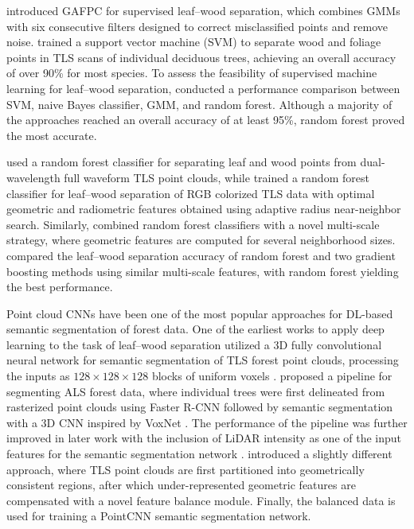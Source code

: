 \cite{ma2016improved} introduced GAFPC for supervised leaf--wood separation, which combines GMMs with six consecutive filters designed to correct misclassified points and remove noise. \cite{yun2016novel} trained a support vector machine (SVM) to separate wood and foliage points in TLS scans of individual deciduous trees, achieving an overall accuracy of over 90\% for most species. To assess the feasibility of supervised machine learning for leaf--wood separation, \cite{wang2017feasibility} conducted a performance comparison between SVM, naive Bayes classifier, GMM, and random forest. Although a majority of the approaches reached an overall accuracy of at least 95\%, random forest proved the most accurate.

\cite{li2018utilization} used a random forest classifier for separating leaf and wood points from dual-wavelength full waveform TLS point clouds, while \cite{zhu2018foliar} trained a random forest classifier for leaf--wood separation of RGB colorized TLS data with optimal geometric and radiometric features obtained using adaptive radius near-neighbor search. Similarly, \cite{zhou2019separating} combined random forest classifiers with a novel multi-scale strategy, where geometric features are computed for several neighborhood sizes. \cite{moorthy2020improved} compared the leaf--wood separation accuracy of random forest and two gradient boosting methods using similar multi-scale features, with random forest yielding the best performance.

Point cloud CNNs have been one of the most popular approaches for DL-based semantic segmentation of forest data. One of the earliest works to apply deep learning to the task of leaf--wood separation utilized a 3D fully convolutional neural network for semantic segmentation of TLS forest point clouds, processing the inputs as $128\times128\times128$ blocks of uniform voxels \citep{xi2018filtering}. \citet{windrim2019forest} proposed a pipeline for segmenting ALS forest data, where individual trees were first delineated from rasterized point clouds using Faster R-CNN \citep{ren2017faster} followed by semantic segmentation with a 3D CNN inspired by VoxNet \citep{maturana2015voxnet}. The performance of the pipeline was further improved in later work with the inclusion of LiDAR intensity as one of the input features for the semantic segmentation network \citep{windrim2020detection}. \cite{shen2022deep} introduced a slightly different approach, where TLS point clouds are first partitioned into geometrically consistent regions, after which under-represented geometric features are compensated with a novel feature balance module. Finally, the balanced data is used for training a PointCNN semantic segmentation network.

